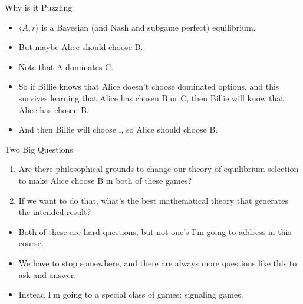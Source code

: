 \documentclass[
  ignorenonframetext,
]{beamer}
\providecommand{\tightlist}{%
  \setlength{\itemsep}{0pt}\setlength{\parskip}{0pt}}
\begin{document}
\begin{frame}{Why is it Puzzling}
\protect\hypertarget{why-is-it-puzzling}{}
\begin{itemize}
\tightlist
\item
  \(\langle A, r \rangle\) is a Bayesian (and Nash and subgame perfect)
  equilibrium.
\item
  But maybe Alice should choose B. \pause
\item
  Note that A dominates C.
\item
  So if Billie knows that Alice doesn't choose dominated options, and
  this survives learning that Alice has chosen B or C, then Billie will
  know that Alice has chosen B.
\item
  And then Billie will choose l, so Alice should choose B.
\end{itemize}
\end{frame}

\begin{frame}{Two Big Questions}
\protect\hypertarget{two-big-questions}{}
\begin{enumerate}
\tightlist
\item
  Are there philosophical grounds to change our theory of equilibrium
  selection to make Alice choose B in both of these games?
\item
  If we want to do that, what's the best mathematical theory that
  generates the intended result?
\end{enumerate}

\begin{itemize}
\tightlist
\item
  Both of these are hard questions, but not one's I'm going to address
  in this course.
\item
  We have to stop somewhere, and there are always more questions like
  this to ask and answer.
\item
  Instead I'm going to a special class of games: signaling games.
\end{itemize}
\end{frame}
\end{document}
